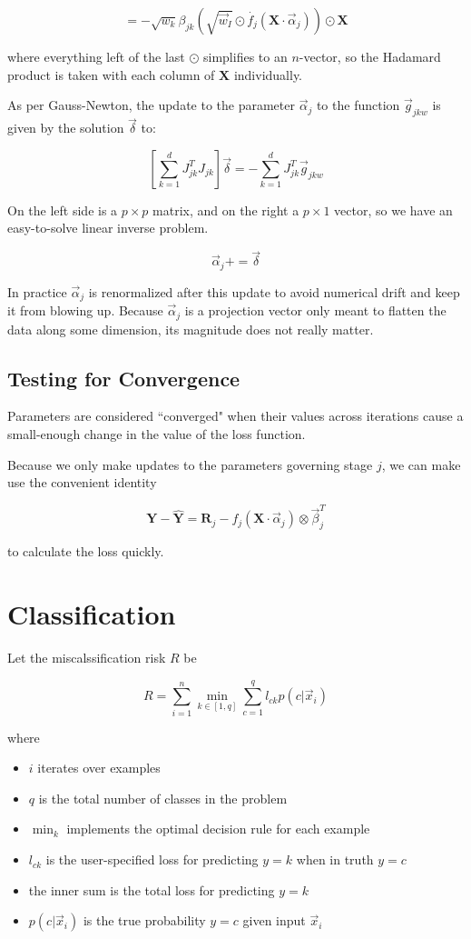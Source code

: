 \documentclass[12pt]{article}
\begin{document}
$$= -\sqrt{w_k} \beta_{jk} (\sqrt{\vec{w}_I} \odot \dot{f_j}(\pmb{X} \cdot \vec{\alpha}_j)) \odot \pmb{X}$$

where everything left of the last $\odot$ simplifies to an $n$-vector, so the Hadamard product is taken with each column of $\pmb{X}$ individually.\newline

As per Gauss-Newton, the update to the parameter $\vec{\alpha}_j$ to the function $\vec{g}_{jkw}$ is given by the solution $\vec{\delta}$ to:

$$\left[ \sum_{k=1}^d J_{jk}^T J_{jk} \right] \vec{\delta} = -\sum_{k=1}^d J_{jk}^T \vec{g}_{jkw}$$

On the left side is a $p \times p$ matrix, and on the right a $p \times 1$ vector, so we have an easy-to-solve linear inverse problem.

$$\vec{\alpha}_j += \vec{\delta}$$

In practice $\vec{\alpha}_j$ is renormalized after this update to avoid numerical drift and keep it from blowing up. Because $\vec{\alpha}_j$ is a projection vector only meant to flatten the data along some dimension, its magnitude does not really matter.

\subsection{Testing for Convergence}

Parameters are considered ``converged" when their values across iterations cause a small-enough change in the value of the loss function.

Because we only make updates to the parameters governing stage $j$, we can make use the convenient identity

$$\pmb{Y} - \pmb{\hat{Y}} = \pmb{R}_j - f_j(\pmb{X} \cdot \vec{\alpha}_j) \otimes \vec{\beta}_j^T$$

to calculate the loss quickly.

\section{Classification}

Let the miscalssification risk $R$ be

$$R = \sum_{i=1}^n \min_{k \in [1,q]} \sum_{c=1}^q l_{ck} p(c | \vec{x}_i)$$

where
\begin{itemize}
	\setlength\itemsep{-2mm}
	\item $i$ iterates over examples
	\item $q$ is the total number of classes in the problem
	\item $\min_k$ implements the optimal decision rule for each example
	\item $l_{ck}$ is the user-specified loss for predicting $y=k$ when in truth $y=c$
	\item the inner sum is the total loss for predicting $y=k$
	\item $p(c | \vec{x}_i)$ is the true probability $y=c$ given input $\vec{x}_i$
\end{itemize}
\end{document}
